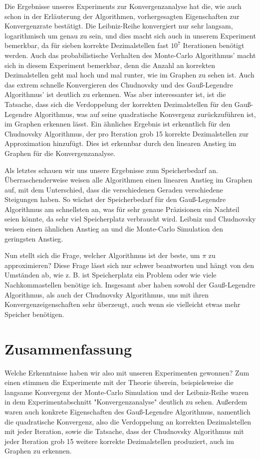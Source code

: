 \documentclass{scrartcl}
\theoremstyle{definition}
\newtheorem{approximation sequence}{Annäherungsfolge}
\begin{document}
Die Ergebnisse unseres Experiments zur Konvergenzanalyse hat die, wie auch
schon in der Erläuterung der Algorithmen, vorhergesagten Eigenschaften zur
Konvergenzrate bestätigt. Die Leibniz-Reihe konvergiert nur sehr langsam,
logarithmisch um genau zu sein, und dies macht sich auch in unserem Experiment
bemerkbar, da für sieben korrekte Dezimalstellen fast \(10^7\) Iterationen
benötigt werden. Auch das probabilistische Verhalten des Monte-Carlo
Algorithmus' macht sich in diesem Experiment bemerkbar, denn die Anzahl an
korrekten Dezimalstellen geht mal hoch und mal runter, wie im Graphen zu sehen
ist. Auch das extrem schnelle Konvergieren des Chudnovsky und des Gauß-Legendre
Algorithmus' ist deutlich zu erkennen. Was aber interessanter ist, ist die
Tatsache, dass sich die Verdoppelung der korrekten Dezimalstellen für den
Gauß-Legendre Algorithmus, was auf seine quadratische Konvergenz zurückzuführen
ist, im Graphen erkennen lässt. Ein ähnliches Ergebnis ist erkenntlich für den
Chudnovsky Algorithmus, der pro Iteration grob 15 korrekte Dezimalstellen zur
Approximation hinzufügt. Dies ist erkennbar durch den linearen Anstieg im
Graphen für die Konvergenzanalyse.

Als letztes schauen wir uns unsere Ergebnisse zum Speicherbedarf an.
Überraschenderweise weisen alle Algorithmen einen linearen Anstieg im Graphen
auf, mit dem Unterschied, dass die verschiedenen Geraden verschiedene
Steigungen haben. So wächst der Speicherbedarf für den Gauß-Legendre
Algorithmus am schnellsten an, was für sehr genaue Präzisionen ein Nachteil
seien könnte, da sehr viel Speicherplatz verbraucht wird. Leibniz und
Chudnovsky weisen einen ähnlichen Anstieg an und die Monte-Carlo Simulation den
geringsten Anstieg.

Nun stellt sich die Frage, welcher Algorithmus ist der beste, um \(\pi\) zu
approximieren? Diese Frage lässt sich nur schwer beantworten und hängt von den
Umständen ab, wie z. B. ist Speicherplatz ein Problem oder wie viele
Nachkommastellen benötige ich. Insgesamt aber haben sowohl der Gauß-Legendre
Algorithmus, als auch der Chudnovsky Algorithmus, uns mit ihren
Konvergenzeigenschaften sehr überzeugt, auch wenn sie vielleicht etwas mehr
Speicher benötigen.

\section{Zusammenfassung}
Welche Erkenntnisse haben wir also mit unseren Experimenten gewonnen? Zum einen
stimmen die Experimente mit der Theorie überein, beispielsweise die langsame
Konvergenz der Monte-Carlo Simulation und der Leibniz-Reihe waren in dem
Experimentabschnitt "Konvergenzanalyse" deutlich zu sehen. Außerdem waren auch
konkrete Eigenschaften des Gauß-Legendre Algorithmus, namentlich die
quadratische Konvergenz, also die Verdoppelung an korrekten Dezimalstellen mit
jeder Iteration, sowie die Tatsache, dass der Chudnovsky Algorithmus mit jeder
Iteration grob 15 weitere korrekte Dezimalstellen produziert, auch im Graphen
zu erkennen.
\end{document}
